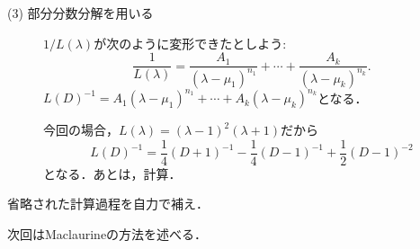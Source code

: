\begin{description}
    \item[(3) 部分分数分解を用いる] $1/L(\lambda)$が次のように変形できたとしよう:
    \[ \frac{1}{L(\lambda)} = \frac{A_1}{(\lambda-\mu_1)^{n_1}} + \cdots + \frac{A_k}{(\lambda-\mu_k)^{n_k}}.\]
    $L(D)^{-1} = A_1(\lambda-\mu_1)^{n_1} + \cdots + A_k(\lambda-\mu_k)^{n_k}$となる．

    今回の場合，$L(\lambda)=(\lambda-1)^2(\lambda+1)$だから
    \[ L(D)^{-1} = \frac{1}{4}(D+1)^{-1} - \frac{1}{4}(D-1)^{-1} + \frac{1}{2}(D-1)^{-2}\]
    となる．あとは，計算．
\end{description}

\begin{homework*}
    省略された計算過程を自力で補え．
\end{homework*}

次回はMaclaurineの方法を述べる．
